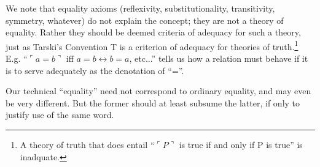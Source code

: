 We note that equality axioms (reflexivity, substitutionality,
transitivity, symmetry, whatever) do not explain the concept; they are
not a theory of equality. Rather they should be deemed criteria of
adequacy for such a theory, just as Tarski's Convention T is a
criterion of adequacy for theories of truth.\footnote{A theory of
truth that does entail ``\(\ulcorner P\urcorner\) is true if and only
if P is true'' is inadquate.} E.g. ``\(\ulcorner a = b\urcorner\) iff
\(a=b ↔ b=a\), etc...'' tells us how a relation must behave if it is
to serve adequately as the denotation of ``=''.

Our technical ``equality'' need not correspond to ordinary equality,
and may even be very different. But the former should at least subsume
the latter, if only to justify use of the same word.

